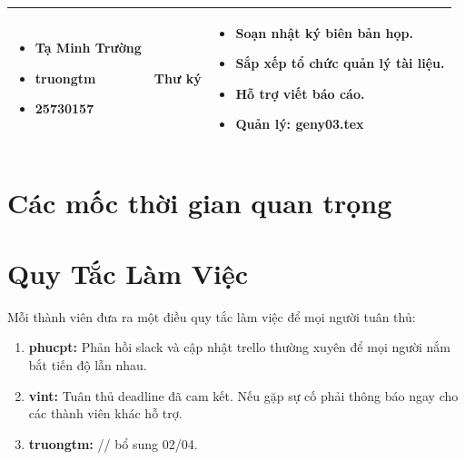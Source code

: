 \documentclass[12pt,a4paper]{article}
\begin{document}
\begin{table}[H]
\begin{tabularx}{\textwidth}{|m{3.5cm}|m{2.5cm}|>{\arraybackslash}X|}
\begin{itemize}[leftmargin=*, nosep, before=\vspace{8pt}, after=\vspace{8pt}]
    \item Tạ Minh Trường
    \item truongtm
    \item 25730157
\end{itemize} & Thư ký & 
\begin{itemize}[leftmargin=*, nosep, before=\vspace{8pt}, after=\vspace{8pt}]
    \item Soạn nhật ký biên bản họp.
    \item Sắp xếp tổ chức quản lý tài liệu.
    \item Hỗ trợ viết báo cáo.
    \item Quản lý: geny03.tex
\end{itemize} \\ \hline
\end{tabularx}
\end{table}

\section{Các mốc thời gian quan trọng}
\begin{center}
\end{center}

\section{Quy Tắc Làm Việc}
Mỗi thành viên đưa ra một điều quy tắc làm việc để mọi người tuân thủ:
\begin{enumerate}[itemsep=0pt, parsep=0pt] 
    \item \textbf{phucpt:} Phản hồi slack và cập nhật trello thường xuyên để mọi người nắm bắt tiến độ lẫn nhau.
    \item \textbf{vint:} Tuân thủ deadline đã cam kết. Nếu gặp sự cố phải thông báo ngay cho các thành viên khác hỗ trợ.
    \item \textbf{truongtm:} // bổ sung 02/04.
\end{enumerate}
\end{document}
